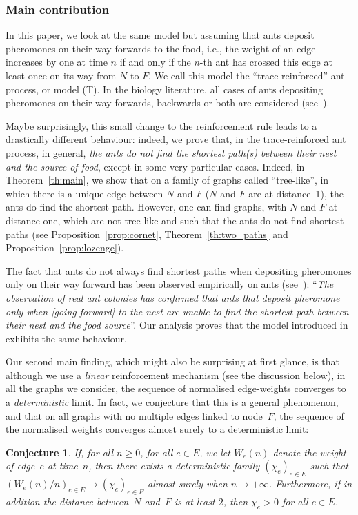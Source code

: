 \documentclass[11pt]{article}
\newcommand{\ie}{i.e.,\xspace}
\numberwithin{equation}{section}
\newtheorem{conjecture}[theorem]{Conjecture}
\theoremstyle{definition}
\begin{document}
\subsubsection*{Main contribution} In this paper, we look at the same model
but assuming that ants deposit pheromones on their way forwards to the food,
\ie the weight of an edge increases by one at time $n$ if and only
if the $n$-th ant has crossed this edge at least once on its way from $N$ to $F$.
We call this model the ``trace-reinforced'' ant process, or model (T).
In the biology literature, all cases of ants depositing pheromones on their way forward{s},
backwards or both are considered (see~\cite[Ch.\,1]{book_ant}).

Maybe surprisingly, this small change to the reinforcement rule leads to a drastically different behaviour:
indeed, we prove that, in the trace-reinforced ant process, in general,
\emph{the ants do not find the shortest path(s) between their nest and the source of food},
except in some very particular cases. Indeed,
in Theorem~\ref{th:main}, we show that on a family of graphs called ``tree-like'', in which there is a unique edge between $N$ and $F$ ($N$ and $F$ are at distance~1), the ants do find the shortest path. However, {one can find graphs, with $N$ and $F$ at distance one, which are not tree-like and such that the ants do not find shortest paths} (see Proposition~\ref{prop:cornet}, Theorem~\ref{th:two_paths} and Proposition~\ref{prop:lozenge}).

The fact that ants do not always find shortest paths when depositing pheromones only on their way
forward has been observed empirically on ants (see~\cite[\S 1.1.2]{book_ant}):
``\emph{The observation of real ant colonies has confirmed that ants that deposit pheromone only
when [going forward] to the nest are unable to find the shortest path between their nest and
the food source}''.
Our analysis proves that the model introduced in~\cite{KMS} exhibits the same behaviour.\enlargethispage{.5\baselineskip}%

Our second main finding, which might also be surprising at first glance, is that although we use a \emph{linear} reinforcement mechanism (see the discussion below), in all the graphs we consider, the sequence of normalised edge-weights converges to a \emph{deterministic} limit.
In fact, we conjecture that this is a general phenomenon, and that on all graphs with no multiple edges linked to node~$F$, the sequence of the normalised weights converges almost surely to a deterministic limit:
\begin{conjecture}\label{conj}
If, for all $n\geq 0$, for all $e\in E$, we let $W_e(n)$ denote the weight of edge~$e$ at time~$n$,
then there exists a deterministic family $(\chi_e)_{e\in E}$
such that $(W_e(n)/n)_{e\in E}\to (\chi_e)_{e\in E}$ almost surely when $n\to+\infty$.
Furthermore, if in addition the distance between~$N$ and~$F$ is at least $2$, then $\chi_e>0$ for all $e\in E$.
\end{conjecture}
\end{document}
